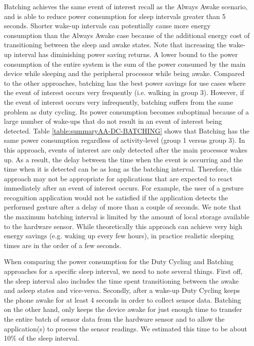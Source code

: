 Batching achieves the same event of interest recall as the Always Awake scenario, and is able to reduce power consumption for sleep intervals greater than 5 seconds. Shorter wake-up intervals can potentially cause more energy consumption than the Always Awake case because of the additional energy cost of transitioning between the sleep and awake states. Note that increasing the wake-up interval has diminishing power saving returns. A lower bound to the power consumption of the entire system is the sum of the power consumed by the main device while sleeping and the peripheral processor while being awake. Compared to the other approaches, batching has the best power savings for use cases where the event of interest occurs very frequently (i.e. walking in group 3). However, if the event of interest occurs very infrequently, batching suffers from the same problem as duty cycling. Its power consumption becomes suboptimal because of a large number of wake-ups that do not result in an event of interest being detected. Table \ref{table:summaryAA-DC-BATCHING} shows that Batching has the same power consumption regardless of activity-level (group 1 versus group 3). In this approach, events of interest are only detected after the main processor wakes up. As a result, the delay between the time when the event is occurring and the time when it is detected can be as long as the batching interval. Therefore, this approach may not be appropriate for applications that are expected to react immediately after an event of interest occurs. For example, the user of a gesture recognition application would not be satisfied if the application detects the performed gesture after a delay of more than a couple of seconds. We note that the maximum batching interval is limited by the amount of local storage available to the hardware sensor. While theoretically this approach can achieve very high energy savings (e.g. waking up every few hours), in practice realistic sleeping times are in the order of a few seconds.

When comparing the power consumption for the Duty Cycling and Batching approaches for a specific sleep interval, we need to note several things. First off, the sleep interval also includes the time spent transitioning between the awake and asleep states and vice-versa. Secondly, after a wake-up Duty Cycling keeps the phone awake for at least 4 seconds in order to collect sensor data. Batching on the other hand, only keeps the device awake for just enough time to transfer the entire batch of sensor data from the hardware sensor and to allow the application(s) to process the sensor readings. We estimated this time to be about 10\% of the sleep interval. 

